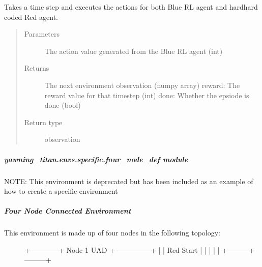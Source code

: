 \documentclass[letterpaper,10pt,english]{sphinxmanual}
\begin{document}
\begin{fulllineitems}
\begin{fulllineitems}
\label{\detokenize{source/yawning_titan.envs.specific:yawning_titan.envs.specific.five_node_def.FiveNodeDef.step}}
\sphinxAtStartPar
Takes a time step and executes the actions for both Blue RL agent and
hard\sphinxhyphen{}hard coded Red agent.
\begin{quote}\begin{description}
\item[{Parameters}] \leavevmode
\sphinxAtStartPar
{} \textendash{} The action value generated from the Blue RL agent (int)

\item[{Returns}] \leavevmode
\sphinxAtStartPar
The next environment observation (numpy array)
reward: The reward value for that timestep (int)
done: Whether the epsiode is done (bool)

\item[{Return type}] \leavevmode
\sphinxAtStartPar
observation

\end{description}\end{quote}

\end{fulllineitems}


\end{fulllineitems}



\subparagraph{yawning\_titan.envs.specific.four\_node\_def module}
\label{\detokenize{source/yawning_titan.envs.specific:module-yawning_titan.envs.specific.four_node_def}}\label{\detokenize{source/yawning_titan.envs.specific:yawning-titan-envs-specific-four-node-def-module}}
\sphinxAtStartPar
NOTE: This environment is deprecated but has been included as an example of how to create a specific environment


\subparagraph{Four Node Connected Environment}
\label{\detokenize{source/yawning_titan.envs.specific:four-node-connected-environment}}\begin{description}
\item[{This environment is made up of four nodes in the following topology:}] \leavevmode\begin{quote}
\end{quote}

\sphinxAtStartPar
+————\textendash{}+   Node 1 \sphinxhyphen{} UAD    +—————+
|              |     Red Start     |               |
|              |                   |     +———+———+

\end{description}
\end{document}

